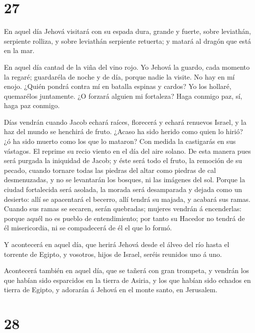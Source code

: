 \hypertarget{section-26}{%
\section{27}\label{section-26}}

 En aquel día Jehová visitará con su espada dura, grande y
fuerte, sobre leviathán, serpiente rolliza, y sobre leviathán serpiente
retuerta; y matará al dragón que está en la mar.

 En aquel día cantad de la viña del vino rojo. 
Yo Jehová la guardo, cada momento la regaré; guardaréla de noche y de
día, porque nadie la visite.  No hay en mí enojo. ¿Quién
pondrá contra mí en batalla espinas y cardos? Yo los hollaré, quemarélos
juntamente.  ¿O forzará alguien mi fortaleza? Haga conmigo
paz, sí, haga paz conmigo.

 Días vendrán cuando Jacob echará raíces, florecerá y echará
renuevos Israel, y la haz del mundo se henchirá de fruto. 
¿Acaso ha sido herido como quien lo hirió? ¿ó ha sido muerto como los
que lo mataron?  Con medida la castigarás en sus vástagos.
El reprime su recio viento en el día del aire solano.  De
esta manera pues será purgada la iniquidad de Jacob; y éste será todo el
fruto, la remoción de su pecado, cuando tornare todas las piedras del
altar como piedras de cal desmenuzadas, y no se levantarán los bosques,
ni las imágenes del sol.  Porque la ciudad fortalecida será
asolada, la morada será desamparada y dejada como un desierto: allí se
apacentará el becerro, allí tendrá su majada, y acabará sus ramas.
 Cuando sus ramas se secaren, serán quebradas; mujeres
vendrán á encenderlas: porque aquél no es pueblo de entendimiento; por
tanto su Hacedor no tendrá de él misericordia, ni se compadecerá de él
el que lo formó.

 Y acontecerá en aquel día, que herirá Jehová desde el
álveo del río hasta el torrente de Egipto, y vosotros, hijos de Israel,
seréis reunidos uno á uno.

 Acontecerá también en aquel día, que se tañerá con gran
trompeta, y vendrán los que habían sido esparcidos en la tierra de
Asiria, y los que habían sido echados en tierra de Egipto, y adorarán á
Jehová en el monte santo, en Jerusalem.

\hypertarget{section-27}{%
\section{28}\label{section-27}}

